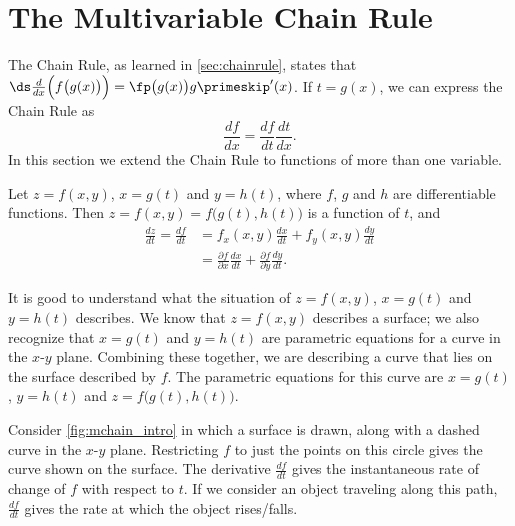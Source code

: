 \section{The Multivariable Chain Rule}\label{sec:multi_chain}

The Chain Rule, as learned in \autoref{sec:chainrule}, states that $\ds \frac{d}{dx}\Big(f\big(g(x)\big)\Big) = \fp\big(g(x)\big)g\primeskip'(x)$. If $t=g(x)$, we can express the Chain Rule as 
$$\frac{df}{dx} = \frac{df}{dt}\frac{dt}{dx}.$$
In this section we extend the Chain Rule to functions of more than one variable.

{Let $z=f(x,y)$, $x=g(t)$ and $y=h(t)$, where $f$, $g$ and $h$ are differentiable functions. Then $z = f(x,y) = f\big(g(t),h(t)\big)$ is a function of $t$, and 
\begin{align*}
\frac{dz}{dt} = \frac{df}{dt} &= f_x(x,y)\frac{dx}{dt}+f_y(x,y)\frac{dy}{dt}\\[5pt]
		&= \frac{\partial f}{\partial x}\frac{dx}{dt}+\frac{\partial f}{\partial y}\frac{dy}{dt}.
\end{align*}
}

It is good to understand what the situation of $z=f(x,y)$, $x=g(t)$ and $y=h(t)$ describes. We know that $z=f(x,y)$ describes a surface; we also recognize that $x=g(t)$ and $y=h(t)$ are parametric equations for a curve in the $x$-$y$ plane. Combining these together, we are describing a curve that lies on the surface described by $f$. The parametric equations for this curve are $x=g(t)$, $y=h(t)$ and $z=f\big(g(t),h(t)\big)$.


Consider \autoref{fig:mchain_intro} in which a surface is drawn, along with a dashed curve in the $x$-$y$ plane. Restricting $f$ to just the points on this circle gives the curve shown on the surface. The derivative $\frac{df}{dt}$ gives the instantaneous rate of change of $f$ with respect to $t$. If we consider an object traveling along this path, $\frac{df}{dt}$ gives the rate at which the object rises/falls.

